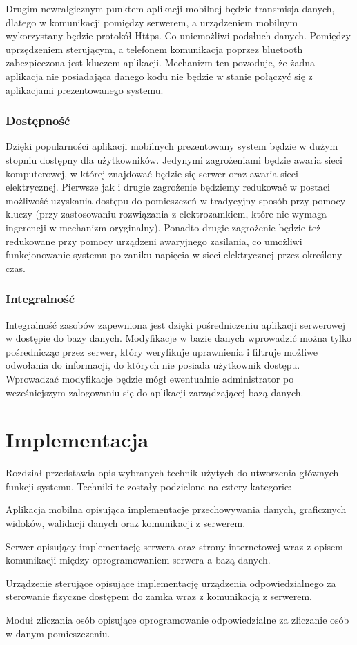 \documentclass[twoside,10pt]{article}
\begin{document}
Drugim newralgicznym punktem aplikacji mobilnej będzie transmisja danych, dlatego w komunikacji pomiędzy serwerem, a urządzeniem mobilnym wykorzystany będzie protokół Https. Co uniemożliwi podsłuch danych. Pomiędzy uprzędzeniem sterującym, a telefonem komunikacja poprzez bluetooth zabezpieczona jest kluczem aplikacji. Mechanizm ten powoduje, że żadna aplikacja nie posiadająca danego kodu nie będzie w stanie połączyć się z aplikacjami prezentowanego systemu.

\subsubsection{Dostępność}
Dzięki popularności aplikacji mobilnych prezentowany system będzie w dużym stopniu dostępny dla użytkowników. Jedynymi zagrożeniami będzie awaria sieci komputerowej, w której znajdować będzie się serwer oraz awaria sieci elektrycznej. Pierwsze jak i drugie zagrożenie będziemy redukować w postaci możliwość uzyskania dostępu do pomieszczeń w tradycyjny sposób przy pomocy kluczy (przy zastosowaniu rozwiązania z elektrozamkiem, które nie wymaga ingerencji w mechanizm oryginalny). Ponadto drugie zagrożenie będzie też redukowane przy pomocy urządzeni awaryjnego zasilania, co umożliwi funkcjonowanie systemu po zaniku napięcia w sieci elektrycznej przez określony czas.
\subsubsection{Integralność}
Integralność zasobów zapewniona jest dzięki pośredniczeniu aplikacji serwerowej w dostępie do bazy danych. Modyfikacje w bazie danych wprowadzić można tylko pośrednicząc przez serwer, który weryfikuje uprawnienia i filtruje możliwe odwołania do informacji, do których nie posiada użytkownik dostępu. Wprowadzać modyfikacje będzie mógł ewentualnie administrator po wcześniejszym zalogowaniu się do aplikacji zarządzającej bazą danych.

\newpage\section{Implementacja} \label{sec:implementacja}
Rozdział przedstawia opis wybranych technik użytych do utworzenia głównych funkcji systemu. Techniki te zostały podzielone na cztery kategorie:
\begin{itemize*}
\item Aplikacja mobilna opisująca implementacje przechowywania danych, graficznych widoków, walidacji danych oraz komunikacji z serwerem. 
\item Serwer opisujący implementację serwera  oraz strony internetowej wraz z opisem komunikacji między oprogramowaniem serwera a bazą danych.
\item  Urządzenie sterujące opisujące implementację urządzenia odpowiedzialnego za sterowanie fizyczne dostępem do zamka wraz z komunikacją z serwerem.
\item Moduł zliczania osób opisujące oprogramowanie odpowiedzialne za zliczanie osób w danym pomieszczeniu. 
\end{itemize*} 
\end{document}

